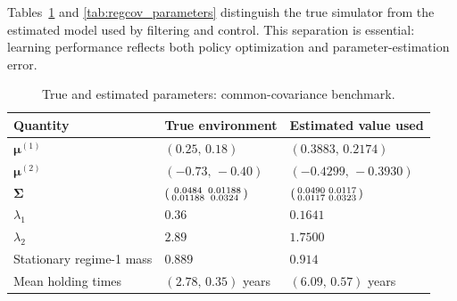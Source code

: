 \documentclass[a4paper,10pt]{article}
\newcommand{\bmu}{\bm{\mu}}
\newcommand{\bSigma}{\bm{\Sigma}}
\begin{document}
Tables~\ref{tab:common_parameters} and \ref{tab:regcov_parameters} distinguish the true simulator from the estimated model used by filtering and control. This separation is essential: learning performance reflects both policy optimization and parameter-estimation error.

\begin{table}[H]
\centering
\small
\caption{True and estimated parameters: common-covariance benchmark.}
\label{tab:common_parameters}
\begin{tabular}{>{\raggedright\arraybackslash}p{} >{\raggedright\arraybackslash}p{} >{\raggedright\arraybackslash}p{}}
\toprule
Quantity & True environment & Estimated value used \\
\midrule
$\bmu^{(1)}$ & $(0.25,\,0.18)$ & $(0.3883,\,0.2174)$ \\
$\bmu^{(2)}$ & $(-0.73,\,-0.40)$ & $(-0.4299,\,-0.3930)$ \\
$\bSigma$ & $\begin{psmallmatrix}0.0484&0.01188\\0.01188&0.0324\end{psmallmatrix}$ & $\begin{psmallmatrix}0.0490&0.0117\\0.0117&0.0323\end{psmallmatrix}$ \\
$\lambda_1$ & $0.36$ & $0.1641$ \\
$\lambda_2$ & $2.89$ & $1.7500$ \\
Stationary regime-1 mass & $0.889$ & $0.914$ \\
Mean holding times & $(2.78,\,0.35)$ years & $(6.09,\,0.57)$ years \\
\bottomrule
\end{tabular}
\end{table}
\end{document}
